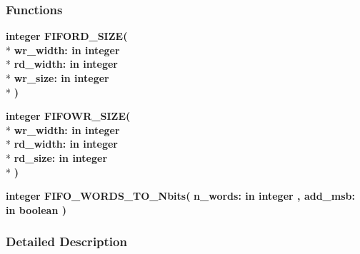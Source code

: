 \subsubsection*{Functions}
 \begin{DoxyCompactItemize}
\item 
{\bfseries {\bfseries \textcolor{comment}{integer}\textcolor{vhdlchar}{ }}} {\bf F\+I\+F\+O\+R\+D\+\_\+\+S\+I\+ZE}{\bfseries  ( }\\*
{\bfseries \textcolor{vhdlchar}{wr\+\_\+width\+: }\textcolor{stringliteral}{in }{\bfseries \textcolor{comment}{integer}\textcolor{vhdlchar}{ }}}\\*
{\bfseries \textcolor{vhdlchar}{rd\+\_\+width\+: }\textcolor{stringliteral}{in }{\bfseries \textcolor{comment}{integer}\textcolor{vhdlchar}{ }}}\\*
{\bfseries \textcolor{vhdlchar}{wr\+\_\+size\+: }\textcolor{stringliteral}{in }{\bfseries \textcolor{comment}{integer}\textcolor{vhdlchar}{ }}}\\*
{\bfseries  )} 
\item 
{\bfseries {\bfseries \textcolor{comment}{integer}\textcolor{vhdlchar}{ }}} {\bf F\+I\+F\+O\+W\+R\+\_\+\+S\+I\+ZE}{\bfseries  ( }\\*
{\bfseries \textcolor{vhdlchar}{wr\+\_\+width\+: }\textcolor{stringliteral}{in }{\bfseries \textcolor{comment}{integer}\textcolor{vhdlchar}{ }}}\\*
{\bfseries \textcolor{vhdlchar}{rd\+\_\+width\+: }\textcolor{stringliteral}{in }{\bfseries \textcolor{comment}{integer}\textcolor{vhdlchar}{ }}}\\*
{\bfseries \textcolor{vhdlchar}{rd\+\_\+size\+: }\textcolor{stringliteral}{in }{\bfseries \textcolor{comment}{integer}\textcolor{vhdlchar}{ }}}\\*
{\bfseries  )} 
\item 
{\bfseries {\bfseries \textcolor{comment}{integer}\textcolor{vhdlchar}{ }}} {\bf F\+I\+F\+O\+\_\+\+W\+O\+R\+D\+S\+\_\+\+T\+O\+\_\+\+Nbits}{\bfseries  ( }{\bfseries \textcolor{vhdlchar}{n\+\_\+words\+: }\textcolor{stringliteral}{in }{\bfseries \textcolor{comment}{integer}\textcolor{vhdlchar}{ }}}{\bfseries  , \textcolor{vhdlchar}{add\+\_\+msb\+: }\textcolor{stringliteral}{in }{\bfseries \textcolor{comment}{boolean}\textcolor{vhdlchar}{ }}}{\bfseries  )} 
\end{DoxyCompactItemize}


\subsubsection{Detailed Description}


